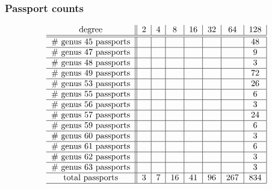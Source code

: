 \documentclass[xcolor=dvipsnames]{beamer}
\theoremstyle{plain}
\begin{document}
  \begin{frame}[plain]
    \frametitle{Passport counts}
    \[
      \begin{tabular}{c||c|c|c|c|c|c|c|}
        degree & $2$ & $4$ & $8$ & $16$ & $32$ & $64$ & $128$\\
        \hline\hline
        \# genus 45 passports &&&&&&& 48 \\
        \hline
        \# genus 47 passports &&&&&&& 9\\
        \hline
        \# genus 48 passports &&&&&&& 3\\
        \hline
        \# genus 49 passports &&&&&&& 72\\
        \hline
        \# genus 53 passports &&&&&&& 26\\
        \hline
        \# genus 55 passports &&&&&&& 6\\
        \hline
        \# genus 56 passports &&&&&&& 3\\
        \hline
        \# genus 57 passports &&&&&&& 24\\
        \hline
        \# genus 59 passports &&&&&&& 6\\
        \hline
        \# genus 60 passports &&&&&&& 3\\
        \hline
        \# genus 61 passports &&&&&&& 6\\
        \hline
        \# genus 62 passports &&&&&&& 3\\
        \hline
        \# genus 63 passports &&&&&&& 3\\
        \hline
        total passports & 3 & 7 & 16 & 41 & 96 & 267 & 834\\
        \hline
      \end{tabular}
    \]
    \vfill
  \end{frame}
\end{document}
